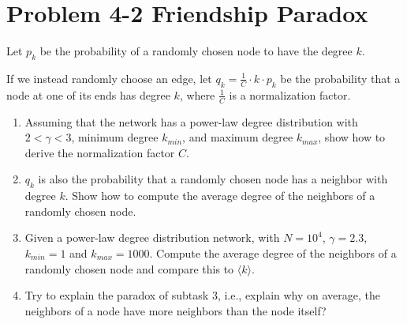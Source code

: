 \section{Problem 4-2 Friendship Paradox}

Let $p_k$ be the probability of a randomly chosen node to have the degree $k$.

If we instead randomly choose an edge, let $q_k = \frac{1}{C} \cdot k \cdot p_k$ be the probability that a node at one of its ends has degree $k$, where $\frac{1}{C}$ is a normalization factor.

\begin{enumerate}
	\item Assuming that the network has a power-law degree distribution with $2 < \gamma
< 3$, minimum degree $k_{min}$, and maximum degree $k_{max}$, show how to derive the normalization factor $C$.
	
	\item $q_k$ is also the probability that a randomly chosen node has a neighbor with degree $k$. Show how to compute the average degree of the neighbors of a randomly chosen node.
	
	\item Given a power-law degree distribution network, with $N = 10^4$, $\gamma = 2.3$, $k_{min} = 1$ and $k_{max} = 1000$. Compute the average degree of the neighbors of a randomly chosen node and compare this to $\langle k \rangle$.
	
	\item Try to explain the paradox of subtask 3, i.e., explain why on average, the neighbors of a node have more neighbors than the node itself?
		
\end{enumerate}